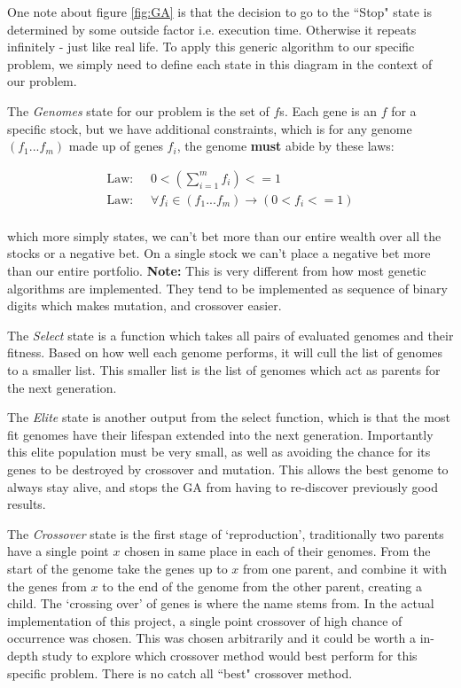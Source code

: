 \documentclass[11pt]{article}
\begin{document}
    One note about figure \ref{fig:GA} is that the decision to go to the ``Stop"
    state is determined by some outside factor i.e. execution time. Otherwise
    it repeats infinitely - just like real life. To apply this generic algorithm to 
    our specific problem, we simply need to
    define each state in this diagram in the context of our problem.

    The \textit{Genomes} state for our problem is the set of \(f\)s. Each gene is an
    \(f\) for a specific stock, but we have additional constraints, which is for 
    any genome \((f_1...f_m)\) made up of genes \(f_i\), the genome \textbf{must}
    abide by these laws:

    \begin{align*}
        \text{Law: } & \;
        0 < \left(
            \displaystyle\sum^{m}_{i=1} f_i
        \right) <= 1 \\
        \text{Law: } & \;
        \forall f_i \in (f_1...f_m) \to \left(
            0 < f_i <= 1
        \right) \\
    \end{align*}

    which more simply states, we can't bet more than our entire wealth over all the stocks or
    a negative bet. On a single stock we can't place a negative bet more than our
    entire portfolio. \textbf{Note:} This is very different from how most genetic algorithms
    are implemented. They tend to be implemented as sequence of binary digits which makes
    mutation, and crossover easier. 

    The \textit{Select} state is a function which takes all pairs of evaluated genomes
    and their fitness. Based on how well each genome performs, it will cull the
    list of genomes to a smaller list. This smaller list is the list of genomes
    which act as parents for the next generation.

    The \textit{Elite} state is another output from the select function, which is
    that the most fit genomes have their lifespan extended into the next generation.
    Importantly this elite population must be very small, as well as avoiding the
    chance for its genes to be destroyed by crossover and mutation. \cite{DeJong}
    This allows the best genome to always stay alive, and stops the GA from
    having to re-discover previously good results.

    The \textit{Crossover} state is the first stage of `reproduction', traditionally two parents
    have a single point \(x\) chosen in same place in each of their genomes. From the start of the
    genome take the genes up to \(x\) from one parent, and combine it with the genes from \(x\) to
    the end of the genome from the other parent, creating a child. The `crossing over' of genes is
    where the name stems from. In the actual implementation of this project,
    a single point crossover of high chance of occurrence was chosen. This was
    chosen arbitrarily and it could be worth a in-depth study to explore which crossover
    method would best perform for this specific problem. There is no catch all
    ``best" crossover method.
\end{document}
